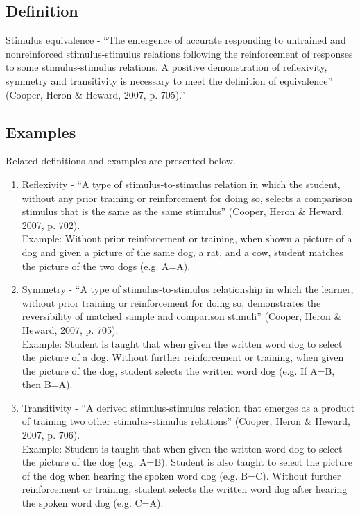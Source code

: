 \subsection{Definition}
Stimulus equivalence - ``The emergence of accurate responding to untrained and nonreinforced stimulus-stimulus relations following the reinforcement of responses to some stimulus-stimulus relations. A positive demonstration of reflexivity, symmetry and transitivity is necessary to meet the definition of equivalence'' (Cooper, Heron \& Heward, 2007, p. 705).'' 

\subsection{Examples}
Related definitions and examples are presented below.
\begin{enumerate}
\item Reflexivity - ``A type of stimulus-to-stimulus relation in which the student, without any prior training or reinforcement for doing so, selects a comparison stimulus that is the same as the same stimulus'' (Cooper, Heron \& Heward, 2007, p. 702).\\
 Example: Without prior reinforcement or training, when shown a picture of a dog and given a picture of the same dog, a rat, and a cow, student matches the picture of the two dogs (e.g. A=A).
\item Symmetry - ``A type of stimulus-to-stimulus relationship in which the learner, without prior training or reinforcement for doing so, demonstrates the reversibility of matched sample and comparison stimuli'' (Cooper, Heron \& Heward, 2007, p. 705).\\
 Example: Student is taught that when given the written word dog to select the picture of a dog. Without further reinforcement or training, when given the picture of the dog, student selects the written word dog (e.g. If A=B, then B=A). 
\item Transitivity - ``A derived stimulus-stimulus relation that emerges as a product of training two other stimulus-stimulus relations'' (Cooper, Heron \& Heward, 2007, p. 706).\\
 Example: Student is taught that when given the written word dog to select the picture of the dog (e.g. A=B). Student is also taught to select the picture of the dog when hearing the spoken word dog (e.g. B=C). Without further reinforcement or training, student selects the written word dog after hearing the spoken word dog (e.g. C=A). 


\end{enumerate}
